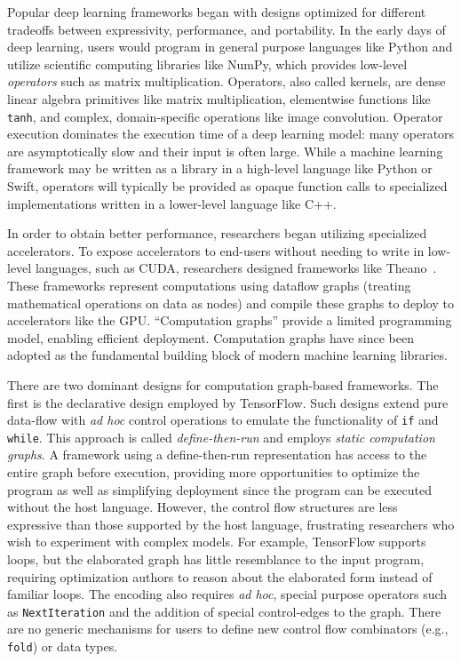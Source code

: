 Popular deep learning frameworks began with designs
  optimized for different tradeoffs between
  expressivity, performance, and portability.
In the early days of deep learning, users would program
  in general purpose languages like Python and utilize
  scientific computing libraries like NumPy,
  which provides low-level \textit{operators} such as matrix multiplication.
Operators, also called kernels, are dense linear algebra primitives like matrix multiplication,
  elementwise functions like \verb|tanh|,
  and complex, domain-specific operations like image convolution.
Operator execution dominates the execution time of a deep learning model: many
  operators are asymptotically slow and their input is often large.
While a machine learning framework may be written as a library in a high-level language
  like Python or Swift, operators will typically be provided as opaque function calls to
  specialized implementations written in a lower-level language like C++.

In order to obtain better performance, researchers began utilizing specialized accelerators.
To expose accelerators to end-users without needing to write in low-level languages,
such as CUDA, researchers designed frameworks like Theano~\citep{theano}.
These frameworks represent computations using dataflow graphs
  (treating mathematical operations on data as nodes)
  and compile these graphs to deploy to
  accelerators like the GPU.
``Computation graphs'' provide a limited programming model,
  enabling efficient deployment.
Computation graphs have since been adopted as the fundamental building block of modern
  machine learning libraries.

There are two dominant designs for computation graph-based frameworks.
The first is the declarative design employed by TensorFlow.
Such designs extend pure data-flow with \textit{ad hoc} control operations
  to emulate the functionality of \verb|if| and \verb|while|.
This approach is called \textit{define-then-run} and employs \textit{static
computation graphs}.
A framework using a define-then-run representation has access to the entire
  graph before execution, providing more opportunities to optimize the program
  as well as simplifying deployment since the program can be executed
  without the host language.
However, the control flow structures are less expressive than those supported
  by the host language, frustrating researchers who wish to experiment with complex models.
For example, TensorFlow supports loops,
  but the elaborated graph has little resemblance to the input program, requiring optimization
  authors to reason about the elaborated form instead of familiar loops.
The encoding also requires \textit{ad hoc}, special purpose operators such
  as \verb|NextIteration| and the addition of special control-edges to the graph.
There are no generic mechanisms for users to define new control flow
  combinators (e.g., \verb|fold|) or data types.

